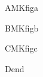 \documentclass{beamer}
\begin{document}
\begin{frame}{A}MKfiga\label{fig:{a}}\end{frame}
\begin{frame}{B}MKfigb\label{fig:b}\end{frame}
\begin{frame}{C}MKfigc\label{fig:{c}}\end{frame}
\begin{frame}{D}end\end{frame}
\end{document}
